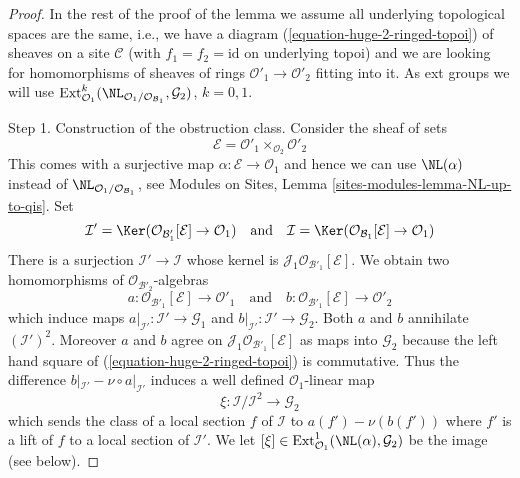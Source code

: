 \begin{proof}
\medskip\noindent
In the rest of the proof of the lemma we assume
all underlying topological spaces are the
same, i.e., we have a diagram (\ref{equation-huge-2-ringed-topoi})
of sheaves on a site $\mathcal{C}$ (with $f_1 = f_2 = \text{id}$
on underlying topoi) and we are looking for
homomorphisms of sheaves of rings
$\mathcal{O}'_1 \to \mathcal{O}'_2$ fitting into it.
As ext groups we will use
$\text{Ext}^k_{\mathcal{O}_1}(
\NL_{\mathcal{O}_1/\mathcal{O}_{\mathcal{B}_1}}, \mathcal{G}_2)$, $k = 0, 1$.

\medskip\noindent
Step 1. Construction of the obstruction class. Consider the sheaf
of sets
$$
\mathcal{E} = \mathcal{O}'_1 \times_{\mathcal{O}_2} \mathcal{O}'_2
$$
This comes with a surjective map $\alpha : \mathcal{E} \to \mathcal{O}_1$
and hence we can use $\NL(\alpha)$ instead of
$\NL_{\mathcal{O}_1/\mathcal{O}_{\mathcal{B}_1}}$, see
Modules on Sites, Lemma \ref{sites-modules-lemma-NL-up-to-qis}.
Set
$$
\mathcal{I}' =
\Ker(\mathcal{O}_{\mathcal{B}'_1}[\mathcal{E}] \to \mathcal{O}_1)
\quad\text{and}\quad
\mathcal{I} =
\Ker(\mathcal{O}_{\mathcal{B}_1}[\mathcal{E}] \to \mathcal{O}_1)
$$
There is a surjection $\mathcal{I}' \to \mathcal{I}$ whose kernel
is $\mathcal{J}_1\mathcal{O}_{\mathcal{B}'_1}[\mathcal{E}]$.
We obtain two homomorphisms of $\mathcal{O}_{\mathcal{B}'_2}$-algebras
$$
a : \mathcal{O}_{\mathcal{B}'_1}[\mathcal{E}] \to \mathcal{O}'_1
\quad\text{and}\quad
b : \mathcal{O}_{\mathcal{B}'_1}[\mathcal{E}] \to \mathcal{O}'_2
$$
which induce maps $a|_{\mathcal{I}'} : \mathcal{I}' \to \mathcal{G}_1$ and
$b|_{\mathcal{I}'} : \mathcal{I}' \to \mathcal{G}_2$. Both $a$ and $b$
annihilate $(\mathcal{I}')^2$. Moreover $a$ and $b$ agree on
$\mathcal{J}_1\mathcal{O}_{\mathcal{B}'_1}[\mathcal{E}]$
as maps into $\mathcal{G}_2$
because the left hand square of (\ref{equation-huge-2-ringed-topoi})
is commutative. Thus the difference
$b|_{\mathcal{I}'} - \nu \circ a|_{\mathcal{I}'}$
induces a well defined $\mathcal{O}_1$-linear map
$$
\xi : \mathcal{I}/\mathcal{I}^2 \longrightarrow \mathcal{G}_2
$$
which sends the class of a local section $f$ of $\mathcal{I}$ to
$a(f') - \nu(b(f'))$ where $f'$ is a lift of $f$ to a local
section of $\mathcal{I}'$. We let
$[\xi] \in \text{Ext}^1_{\mathcal{O}_1}(\NL(\alpha), \mathcal{G}_2)$
be the image (see below).


\end{proof}
